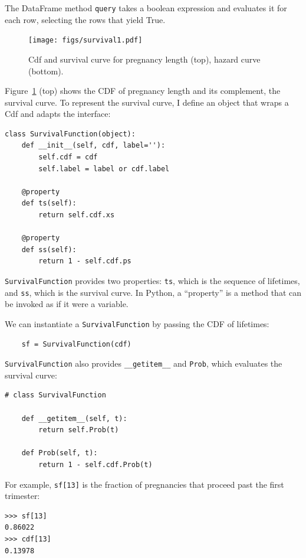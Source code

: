 \documentclass[12pt]{book}
\theoremstyle{exercise}
\begin{document}
The DataFrame method {\tt query} takes a boolean expression and
evaluates it for each row, selecting the rows that yield True.%
%
%

\begin{figure}
\centerline{\texttt{[image: figs/survival1.pdf]}}
\caption{Cdf and survival curve for pregnancy length (top),
hazard curve (bottom).}%
\label{survival1}
\end{figure}

Figure~\ref{survival1} (top) shows the CDF of pregnancy length
and its complement, the survival curve.  To represent the
survival curve, I define an object that wraps a Cdf and
adapts the interface:%
%
%

\begin{verbatim}
class SurvivalFunction(object):
    def __init__(self, cdf, label=''):
        self.cdf = cdf
        self.label = label or cdf.label

    @property
    def ts(self):
        return self.cdf.xs

    @property
    def ss(self):
        return 1 - self.cdf.ps
\end{verbatim}

{\tt SurvivalFunction} provides two properties: {\tt ts}, which
is the sequence of lifetimes, and {\tt ss}, which is the survival
curve.  In Python, a ``property'' is a method that can be
invoked as if it were a variable.

We can instantiate a {\tt SurvivalFunction} by passing
the CDF of lifetimes:%

\begin{verbatim}
    sf = SurvivalFunction(cdf)
\end{verbatim}

{\tt SurvivalFunction} also provides \verb"__getitem__" and
{\tt Prob}, which evaluates the survival curve:

\begin{verbatim}
# class SurvivalFunction

    def __getitem__(self, t):
        return self.Prob(t)

    def Prob(self, t):
        return 1 - self.cdf.Prob(t)
\end{verbatim}

For example, {\tt sf[13]} is the fraction of pregnancies that
proceed past the first trimester:%

\begin{verbatim}
>>> sf[13]
0.86022
>>> cdf[13]
0.13978
\end{verbatim}
\end{document}
